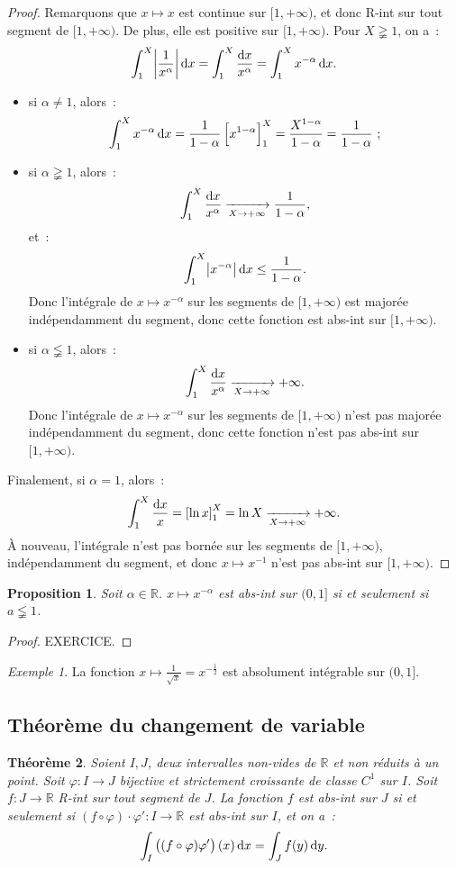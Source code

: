\documentclass{report}
\newtheorem{thm}{Théorème}[chapter]
\newtheorem{prp}[thm]{Proposition}
\theoremstyle{definition}
\theoremstyle{remark}
\newtheorem{ex}{Exemple}[chapter]
\newcommand{\R}{\mathbb R}
\newcommand{\pinfty}{{+\infty}}
\begin{document}
			\begin{proof} Remarquons que $x \mapsto x$ est continue sur $[1, \pinfty)$, et donc R-int sur tout segment de $[1, \pinfty)$. De plus, elle est positive sur
			$[1, \pinfty)$. Pour $X \gneqq 1$, on a~:
			\[\int_1^X\abs {\frac 1{x^\alpha}}\dif x = \int_1^X \frac {\dif x}{x^\alpha} = \int_1^Xx^{-\alpha}\dif x.\]
			\begin{itemize}
				\item si $\alpha \neq 1$, alors~:
				\[\int_1^Xx^{-\alpha}\dif x = \frac 1{1-\alpha}\left[x^{1-\alpha}\right]_1^X = \frac {X^{1-\alpha}}{1-\alpha} = \frac 1{1-\alpha}~;\]
				\item si $\alpha \gneqq 1$, alors~:
				\[\int_1^X\frac {\dif x}{x^\alpha} \xrightarrow[X \to \pinfty]{} \frac 1{1-\alpha},\]
				et~:
				\[\int_1^X\abs {x^{-\alpha}}\dif x \leq \frac 1{1-\alpha}.\]
				Donc l'intégrale de $x \mapsto x^{-\alpha}$ sur les segments de $[1, \pinfty)$ est majorée indépendamment du segment, donc cette fonction est abs-int sur
				$[1, \pinfty)$.
				\item si $\alpha \lneqq 1$, alors~:
				\[\int_1^X \frac {\dif x}{x^\alpha} \xrightarrow[X \to \pinfty]{} \pinfty.\]
				Donc l'intégrale de $x \mapsto x^{-\alpha}$ sur les segments de $[1, \pinfty)$ n'est pas majorée indépendamment du segment, donc cette fonction n'est pas
				abs-int sur $[1, \pinfty)$.
			\end{itemize}

			Finalement, si $\alpha = 1$, alors~:
			\[\int_1^X\frac {\dif x}x = \left[\ln x\right]_1^X = \ln X \xrightarrow[X \to \pinfty]{} \pinfty.\]
			À nouveau, l'intégrale n'est pas bornée sur les segments de $[1, \pinfty)$, indépendamment du segment, et donc $x \mapsto x^{-1}$ n'est pas abs-int sur
			$[1, \pinfty)$.
			\end{proof}

			\begin{prp} Soit $\alpha \in \R$. $x \mapsto x^{-\alpha}$ est abs-int sur $(0, 1]$ si et seulement si $a \lneqq 1$.
			\end{prp}

			\begin{proof} EXERCICE.
			\end{proof}

			\begin{ex} La fonction $x \mapsto \frac 1{\sqrt x} = x^{-\frac 12}$ est absolument intégrable sur $(0, 1]$.
			\end{ex}

		\subsection{Théorème du changement de variable}
			\begin{thm} Soient $I, J$, deux intervalles non-vides de $\R$ et non réduits à un point. Soit $\varphi : I \to J$ bijective et strictement croissante de
			classe $C^1$ sur $I$. Soit $f : J \to \R$ R-int sur tout segment de $J$. La fonction $f$ est abs-int sur $J$ si et seulement si
			$(f \circ \varphi) \cdot \varphi' : I \to \R$ est abs-int sur $I$, et on a~:
			\[\int_I\left((f \circ \varphi)\varphi'\right)(x)\dif x = \int_Jf(y)\dif y.\]
			\end{thm}
\end{document}

